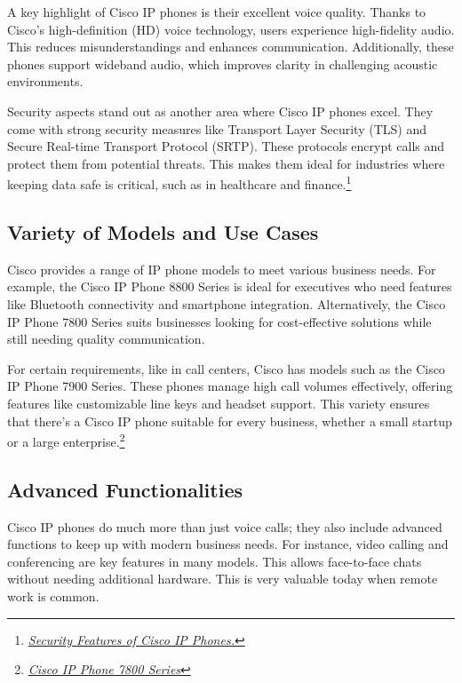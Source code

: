 \documentclass[11pt,a4paper]{article}
\begin{document}
A key highlight of Cisco IP phones is their excellent voice quality. Thanks to Cisco's high-definition (HD) voice technology, users experience high-fidelity audio. This reduces misunderstandings and enhances communication. Additionally, these phones support wideband audio, which improves clarity in challenging acoustic environments.

Security aspects stand out as another area where Cisco IP phones excel. They come with strong security measures like Transport Layer Security (TLS) and Secure Real-time Transport Protocol (SRTP). These protocols encrypt calls and protect them from potential threats. This makes them ideal for industries where keeping data safe is critical, such as in healthcare and finance.\footnote{\href{https://www.cisco.com/c/dam/en/us/products/collateral/collaboration-endpoints/unified-ip-phone-8800-series/white-paper-c11-739097.pdf}{\textit{Security Features of Cisco IP Phones.}}}


\subsection*{Variety of Models and Use Cases}

Cisco provides a range of IP phone models to meet various business needs. For example, the Cisco IP Phone 8800 Series is ideal for executives who need features like Bluetooth connectivity and smartphone integration. Alternatively, the Cisco IP Phone 7800 Series suits businesses looking for cost-effective solutions while still needing quality communication.

For certain requirements, like in call centers, Cisco has models such as the Cisco IP Phone 7900 Series. These phones manage high call volumes effectively, offering features like customizable line keys and headset support. This variety ensures that there’s a Cisco IP phone suitable for every business, whether a small startup or a large enterprise.\footnote{\href{https://www.cisco.com/c/en/us/products/collaboration-endpoints/unified-ip-phone-7800-series/index.html}{\textit{Cisco IP Phone 7800 Series}}}


\subsection*{Advanced Functionalities}

Cisco IP phones do much more than just voice calls; they also include advanced functions to keep up with modern business needs. For instance, video calling and conferencing are key features in many models. This allows face-to-face chats without needing additional hardware. This is very valuable today when remote work is common.
\end{document}
